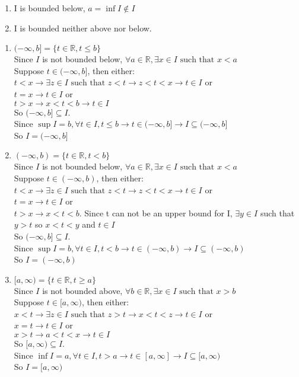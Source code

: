 \documentclass[12pt]{article}
\begin{document}
\begin{enumerate}
\begin{enumerate}
\item I is bounded below, $a = \inf I \notin I$
\item I is bounded neither above nor below.
\end{enumerate}
\begin{enumerate}
\item $(-\infty,b] = \{t\in\mathbb{R}, t \leq b\}$\\
Since $I$ is not bounded below, $\forall a\in \mathbb{R}, \exists x\in I \text{ such that } x < a$\\
Suppose $t\in (-\infty,b]$, then either:\\
$t < x \rightarrow \exists z\in I \text{ such that } z < t \rightarrow z<t<x \rightarrow t\in I$ or\\
$t = x \rightarrow t\in I$ or\\
$t > x \rightarrow x < t < b \rightarrow t\in I$\\
So $(-\infty,b] \subseteq I$.\\
Since $\sup I = b, \forall t\in I, t \leq b \rightarrow t \in (-\infty,b] \rightarrow I\subseteq (-\infty,b]$\\
So $I = (-\infty,b]$
\item $(-\infty,b) = \{t\in\mathbb{R},t<b\}$\\
Since $I$ is not bounded below, $\forall a\in \mathbb{R}, \exists x\in I \text{ such that } x < a$\\
Suppose $t\in (-\infty,b)$, then either:\\
$t < x \rightarrow \exists z\in I \text{ such that } z < t \rightarrow z<t<x \rightarrow t\in I$ or\\
$t = x \rightarrow t\in I$ or\\
$t > x \rightarrow x < t < b$.  Since t can not be an upper bound for I, $\exists y\in I$ such that $y > t$ so $x < t < y$ and $t\in I$\\
So $(-\infty,b] \subseteq I$.\\
Since $\sup I = b, \forall t\in I, t < b \rightarrow t \in (-\infty,b) \rightarrow I\subseteq (-\infty,b)$\\
So $I = (-\infty,b)$
\item $[a,\infty) = \{t\in\mathbb{R}, t \geq a\}$\\

Since $I$ is not bounded above, $\forall b\in \mathbb{R}, \exists x\in I \text{ such that } x > b$\\
Suppose $t\in [a,\infty)$, then either:\\
$x < t \rightarrow \exists z\in I \text{ such that } z > t \rightarrow x<t<z \rightarrow t\in I$ or\\
$x = t \rightarrow t\in I$ or\\
$x > t \rightarrow a < t < x \rightarrow t\in I$\\
So $[a,\infty) \subseteq I$.\\
Since $\inf I = a, \forall t\in I, t > a \rightarrow t \in [a,\infty] \rightarrow I\subseteq [a,\infty)$\\
So $I = [a,\infty)$


\end{enumerate}
\end{enumerate}
\end{document}

